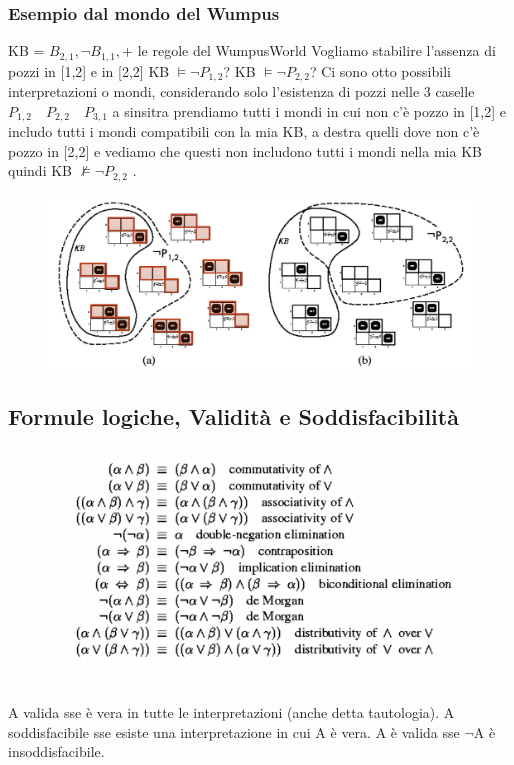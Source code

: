 \documentclass{article}
\begin{document}
\subsubsection{Esempio dal mondo del Wumpus}
KB = $B_{2,1}, \neg B_{1,1} , +$ le regole del WumpusWorld \newline 
Vogliamo stabilire l’assenza di pozzi in [1,2] e in [2,2] \newline
KB $\models \neg P_{1,2}$? \newline
KB $\models \neg P_{2,2}$? \newline
Ci sono otto possibili interpretazioni o mondi, considerando solo l’esistenza di pozzi nelle 3 caselle $P_{1,2} \quad P_{2,2} \quad P_{3,1}$ a sinsitra prendiamo tutti i mondi in cui non c'è pozzo in [1,2] e includo tutti i mondi compatibili con la mia KB, a destra quelli dove non c'è pozzo in [2,2] e vediamo che questi non includono tutti i mondi nella mia KB quindi KB $\nvDash \neg P_{2,2}$ .
\begin{figure}[h!]
\centering
\includegraphics[scale=0.45]{Images/wumpusconslogica.png}
\end{figure}
\subsection{Formule logiche, Validità e Soddisfacibilità}
\begin{figure}[h!]
\centering
\includegraphics[scale=0.35]{Images/formulelogiche.png}
\end{figure}
A valida sse è vera in tutte le interpretazioni (anche detta tautologia). \newline
A soddisfacibile sse esiste una interpretazione in cui A è vera. \newline
A è valida sse $\neg$A è insoddisfacibile. \newline
\end{document}
